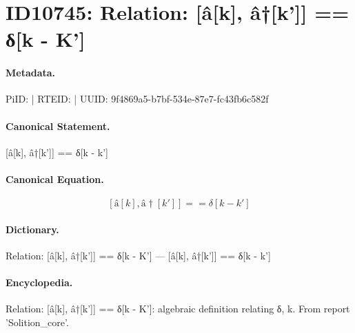 \section*{ID10745: Relation: [â[k], â†[k']] == δ[k - K']}
\paragraph{Metadata.}
PiID:  | RTEID:  | UUID: 9f4869a5-b7bf-534e-87e7-fc43fb6c582f

\paragraph{Canonical Statement.}
[â[k], â†[k']] == δ[k - k']

\paragraph{Canonical Equation.}
\[
[â[k], â†[k']] == δ[k - k']
\]

\paragraph{Dictionary.}
Relation: [â[k], â†[k']] == δ[k - K'] — [â[k], â†[k']] == δ[k - k']

\paragraph{Encyclopedia.}
Relation: [â[k], â†[k']] == δ[k - K']: algebraic definition relating δ, k. From report 'Solition\_core'.
